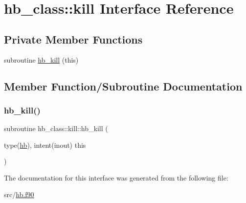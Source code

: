 \hypertarget{interfacehb__class_1_1kill}{}\section{hb\+\_\+class\+:\+:kill Interface Reference}
\label{interfacehb__class_1_1kill}
\subsection*{Private Member Functions}
\begin{DoxyCompactItemize}
\item 
subroutine \hyperlink{interfacehb__class_1_1kill_a34dd0aea3bc633b71c5b0ad0c71a8096}{hb\+\_\+kill} (this)
\end{DoxyCompactItemize}


\subsection{Member Function/\+Subroutine Documentation}
\mbox{\label{interfacehb__class_1_1kill_a34dd0aea3bc633b71c5b0ad0c71a8096}} 
\subsubsection{\texorpdfstring{hb\+\_\+kill()}{hb\_kill()}}
{\footnotesize\ttfamily subroutine hb\+\_\+class\+::kill\+::hb\+\_\+kill (\begin{DoxyParamCaption}\item[{type(\hyperlink{structhb__class_1_1hb}{hb}), intent(inout)}]{this }\end{DoxyParamCaption})\hspace{0.3cm}{\ttfamily [private]}}



The documentation for this interface was generated from the following file\+:\begin{DoxyCompactItemize}
\item 
src/\hyperlink{hb_8f90}{hb.\+f90}\end{DoxyCompactItemize}
